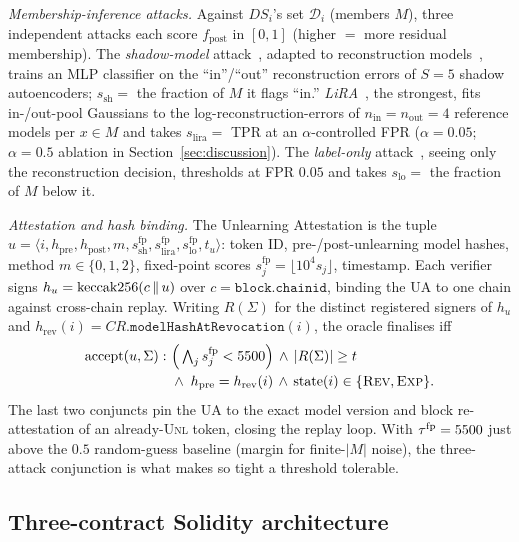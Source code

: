 \emph{Membership-inference attacks.} Against $\mathit{DS}_i$'s set $\mathcal{D}_i$ (members $M$), three
independent attacks each score $f_{\mathrm{post}}$ in $[0,1]$ (higher
$=$ more residual membership). The \emph{shadow-model}
attack~\cite{shokri2017mia}, adapted to reconstruction
models~\cite{hilprecht2019monte}, trains an MLP classifier on the
``in''/``out'' reconstruction errors of $S=5$ shadow autoencoders;
$s_{\mathrm{sh}}=$ the fraction of $M$ it flags ``in.'' \emph{LiRA}~\cite{carlini2022lira}, the strongest,
fits in-/out-pool Gaussians to the log-reconstruction-errors of
$n_{\mathrm{in}}=n_{\mathrm{out}}=4$ reference models per $x\in M$ and
takes $s_{\mathrm{lira}}=$ TPR at an $\alpha$-controlled FPR
($\alpha=0.05$; $\alpha=0.5$ ablation in Section~\ref{sec:discussion}).
The \emph{label-only} attack~\cite{choquettechoo2021labelonly}, seeing
only the reconstruction decision, thresholds at FPR $0.05$ and takes
$s_{\mathrm{lo}}=$ the fraction of $M$ below it.

\emph{Attestation and hash binding.} The Unlearning Attestation is the
tuple $u=\langle i, h_{\mathrm{pre}}, h_{\mathrm{post}}, m,
s_{\mathrm{sh}}^{\mathrm{fp}}, s_{\mathrm{lira}}^{\mathrm{fp}},
s_{\mathrm{lo}}^{\mathrm{fp}}, t_u\rangle$: token ID,
pre-/post-un\-learning model hashes, method $m\in\{0,1,2\}$, fixed-point
scores $s^{\mathrm{fp}}_j=\lfloor 10^4 s_j\rfloor$, timestamp. Each
verifier signs $h_u=\mathrm{keccak256}(c \,\|\, u)$ over $c=\texttt{block.chainid}$,
binding the UA to one chain against cross-chain replay. Writing
$R(\Sigma)$ for the distinct registered signers of $h_u$ and
$h_{\mathrm{rev}}(i)=\mathit{CR}.\mathtt{modelHashAtRevocation}(i)$, the
oracle finalises iff
\begin{equation}\label{eq:accept}
\begin{aligned}
\mathrm{accept}(u,\Sigma):\ &\Big(\textstyle\bigwedge_{j} s_j^{\mathrm{fp}}<5500\Big)
  \,\wedge\, |R(\Sigma)|\ge t\\[-1pt]
  &\wedge\; h_{\mathrm{pre}}=h_{\mathrm{rev}}(i)
  \,\wedge\, \mathrm{state}(i)\in\{\textsc{Rev},\textsc{Exp}\}.
\end{aligned}
\end{equation}
The last two conjuncts pin the UA to the exact model version and block
re-attestation of an already-\textsc{Unl} token, closing the replay
loop. With $\tau^{\mathrm{fp}}=5500$ just above the $0.5$
random-guess baseline (margin for finite-$|M|$ noise), the three-attack
conjunction is what makes so tight a threshold tolerable.

\subsection{Three-contract Solidity architecture}
\label{sec:framework-contracts}


